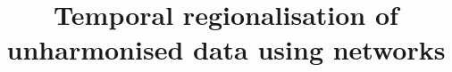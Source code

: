 \documentclass[10pt,letterpaper]{article}
\begin{document}


\doublespacing
\title{Temporal regionalisation of unharmonised data using networks}
\author{}

\maketitle






\end{document}

